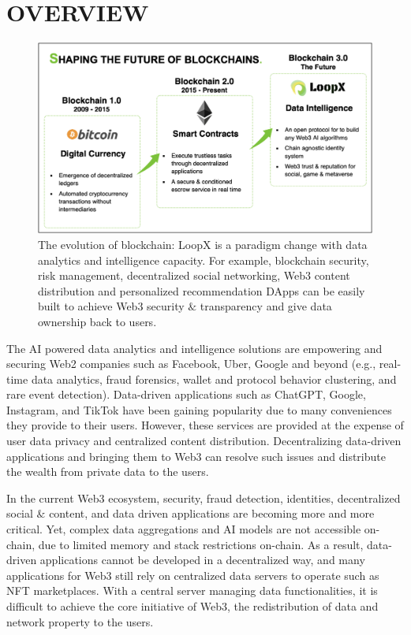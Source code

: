 \documentclass[11pt,letterpaper]{article}
\begin{document}
\newpage

\section{OVERVIEW}
\begin{figure}[ht]
\centering
	\includegraphics[width=6in]{fig/vision.jpg}
\caption{The evolution of blockchain: LoopX is a paradigm change with data analytics and intelligence capacity. For example, blockchain security, risk management, decentralized social networking, Web3 content distribution and personalized recommendation DApps can be easily built to achieve Web3 security $\&$ transparency and give data ownership back to users.} 
\label{fig:blockchain-evolution}
\vspace{-2pt}
\end{figure}

The AI powered data analytics and intelligence solutions are empowering and securing Web2 companies such as Facebook, Uber, Google and beyond (e.g., real-time data analytics, fraud forensics, wallet and protocol behavior clustering, and rare event detection). Data-driven applications such as ChatGPT, Google, Instagram, and TikTok have been gaining popularity due to many conveniences they provide to their users.
However, these services are provided at the expense of user data privacy and centralized content distribution. Decentralizing data-driven applications and bringing them to Web3 can resolve such issues and distribute the wealth from private data to the users.

In the current Web3 ecosystem, security, fraud detection, identities, decentralized social $\&$ content, and data driven applications are becoming more and more critical. Yet, complex data aggregations and AI models are not accessible on-chain, due to limited memory and stack restrictions on-chain. As a result, data-driven applications cannot be developed in a decentralized way, and many applications for Web3 still rely on centralized data servers to operate such as NFT marketplaces. With a central server managing data functionalities, it is difficult to achieve the core initiative of Web3, the redistribution of data and network property to the users.
\end{document}
